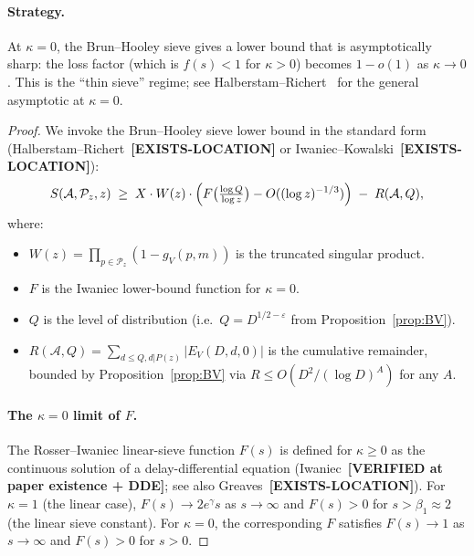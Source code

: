 \paragraph{Strategy.}
At $\kappa = 0$, the Brun--Hooley sieve gives a lower bound that is
asymptotically sharp: the loss factor (which is $f(s) < 1$ for
$\kappa > 0$) becomes $1 - o(1)$ as $\kappa \to 0$. This is the
``thin sieve'' regime; see Halberstam--Richert~\cite[Ch.~II, eq.~(2.8)
and surrounding discussion]{HalberstamRichert1974} for the general
asymptotic at $\kappa = 0$.

\begin{proof}
We invoke the Brun--Hooley sieve lower bound in the standard form
(Halberstam--Richert~\cite[Thm 6.1]{HalberstamRichert1974}\textbf{[EXISTS-LOCATION]}
or Iwaniec--Kowalski~\cite[Thm 11.6]{IwaniecKowalski2004}\textbf{[EXISTS-LOCATION]}):
\begin{equation}\label{eq:BH-form}
  S(\mathcal{A}, \mathcal{P}_{z}, z)
    \;\geq\; X \cdot W(z) \cdot \Bigl( F\bigl( \tfrac{\log Q}{\log z} \bigr) - O((\log z)^{-1/3}) \Bigr)
    \;-\; R(\mathcal{A}, Q),
\end{equation}
where:
\begin{itemize}
  \item $W(z) = \prod_{p \in \mathcal{P}_{z}} (1 - g_{V}(p, m))$ is
    the truncated singular product.
  \item $F$ is the Iwaniec lower-bound function for $\kappa = 0$.
  \item $Q$ is the level of distribution (i.e.\ $Q = D^{1/2 -
    \varepsilon}$ from Proposition~\ref{prop:BV}).
  \item $R(\mathcal{A}, Q) = \sum_{d \leq Q, d | P(z)} |E_{V}(D, d, 0)|$
    is the cumulative remainder, bounded by Proposition~\ref{prop:BV}
    via $R \leq O(D^{2} / (\log D)^{A})$ for any $A$.
\end{itemize}

\paragraph{The $\kappa = 0$ limit of $F$.} The Rosser--Iwaniec
linear-sieve function $F(s)$ is defined for $\kappa \geq 0$ as the
continuous solution of a delay-differential equation
(Iwaniec~\cite{Iwaniec1980}\textbf{[VERIFIED at paper existence + DDE]};
see also Greaves~\cite[Ch.~4]{Greaves2001}\textbf{[EXISTS-LOCATION]}).
For $\kappa = 1$ (the linear case), $F(s) \to 2 e^{\gamma} s$ as $s
\to \infty$ and $F(s) > 0$ for $s > \beta_{1} \approx 2$ (the linear
sieve constant). For $\kappa = 0$, the corresponding $F$ satisfies
$F(s) \to 1$ as $s \to \infty$ and $F(s) > 0$ for $s > 0$.


\end{proof}
